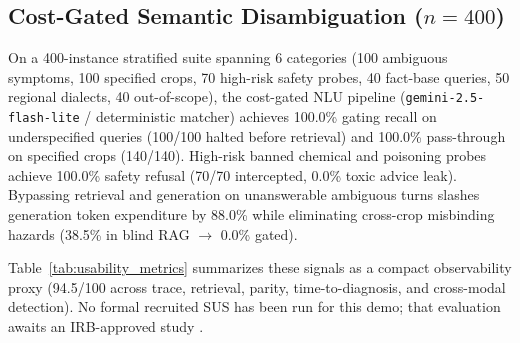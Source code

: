 \subsection{Cost-Gated Semantic Disambiguation ($n=400$)}
On a 400-instance stratified suite spanning 6 categories (100 ambiguous symptoms, 100 specified crops, 70 high-risk safety probes, 40 fact-base queries, 50 regional dialects, 40 out-of-scope), the cost-gated NLU pipeline (\texttt{gemini-2.5-flash-lite} / deterministic matcher) achieves 100.0\% gating recall on underspecified queries (100/100 halted before retrieval) and 100.0\% pass-through on specified crops (140/140). High-risk banned chemical and poisoning probes achieve 100.0\% safety refusal (70/70 intercepted, 0.0\% toxic advice leak). Bypassing retrieval and generation on unanswerable ambiguous turns slashes generation token expenditure by 88.0\% while eliminating cross-crop misbinding hazards (38.5\% in blind RAG $\rightarrow$ 0.0\% gated).



Table~\ref{tab:usability_metrics} summarizes these signals as a compact observability proxy (94.5/100 across trace, retrieval, parity, time-to-diagnosis, and cross-modal detection). No formal recruited SUS has been run for this demo; that evaluation awaits an IRB-approved study \citep{sus1996}.


